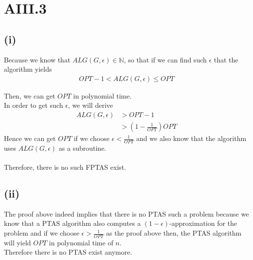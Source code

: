 \section* {AIII.3}
\label {a3-3}
\subsection*{(i)}
Because we know that $ALG(G,\epsilon) \in \mathbb{N}$, so that if we can find such $\epsilon$ that the algorithm yields
\begin{align*}
	OPT - 1 < ALG\left(G,\epsilon \right) \leq OPT
\end{align*}

Then, we can get $OPT$ in polynomial time.\\

In order to get such $\epsilon$, we will derive
\begin{align*}
	ALG\left(G,\epsilon\right) &> OPT - 1\\
	&> \left( 1 - \frac{1}{OPT} \right)OPT
\end{align*}
%	
Hence we can get $OPT$ if we choose $\epsilon < \frac{1}{OPT}$ and we also know that the algorithm uses $ALG(G,\epsilon)$ as a subroutine. \\ \\

Therefore, there is no such FPTAS exist.

\subsection*{(ii)}

The proof above indeed implies that there is no PTAS such a problem because we know that a PTAS algorithm also computes a $(1 - \epsilon)$-approximation for the problem and if we choose $\epsilon > \frac{1}{OPT}$ as the proof above then, the PTAS algorithm will yield $OPT$ in polynomial time of $n$. \\

Therefore there is no PTAS exist anymore.


	

